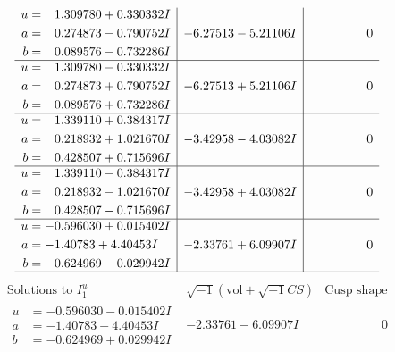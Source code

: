 \documentclass[1p]{elsarticle_modified}
\theoremstyle{definition}
\newcommand{\I}{\sqrt{-1}}
\begin{document}
$$\begin{array}{c|c|c}
\begin{aligned}
u &= \phantom{-}1.309780 + 0.330332 I \\
a &= \phantom{-}0.274873 - 0.790752 I \\
b &= \phantom{-}0.089576 - 0.732286 I\end{aligned}
 & -6.27513 - 5.21106 I & \phantom{-0.000000 } 0 \\ \hline\begin{aligned}
u &= \phantom{-}1.309780 - 0.330332 I \\
a &= \phantom{-}0.274873 + 0.790752 I \\
b &= \phantom{-}0.089576 + 0.732286 I\end{aligned}
 & -6.27513 + 5.21106 I & \phantom{-0.000000 } 0 \\ \hline\begin{aligned}
u &= \phantom{-}1.339110 + 0.384317 I \\
a &= \phantom{-}0.218932 + 1.021670 I \\
b &= \phantom{-}0.428507 + 0.715696 I\end{aligned}
 & -3.42958 - 4.03082 I & \phantom{-0.000000 } 0 \\ \hline\begin{aligned}
u &= \phantom{-}1.339110 - 0.384317 I \\
a &= \phantom{-}0.218932 - 1.021670 I \\
b &= \phantom{-}0.428507 - 0.715696 I\end{aligned}
 & -3.42958 + 4.03082 I & \phantom{-0.000000 } 0 \\ \hline\begin{aligned}
u &= -0.596030 + 0.015402 I \\
a &= -1.40783 + 4.40453 I \\
b &= -0.624969 - 0.029942 I\end{aligned}
 & -2.33761 + 6.09907 I & \phantom{-0.000000 } 0\\
 \hline 
 \end{array}$$\newpage$$\begin{array}{c|c|c}  
\text{Solutions to }I^u_{1}& \I (\text{vol} + \sqrt{-1}CS) & \text{Cusp shape}\\
 \hline 
\begin{aligned}
u &= -0.596030 - 0.015402 I \\
a &= -1.40783 - 4.40453 I \\
b &= -0.624969 + 0.029942 I\end{aligned}
 & -2.33761 - 6.09907 I & \phantom{-0.000000 } 0 \\ \hline\begin{aligned}

\end{aligned}
\end{array}$$
\end{document}
